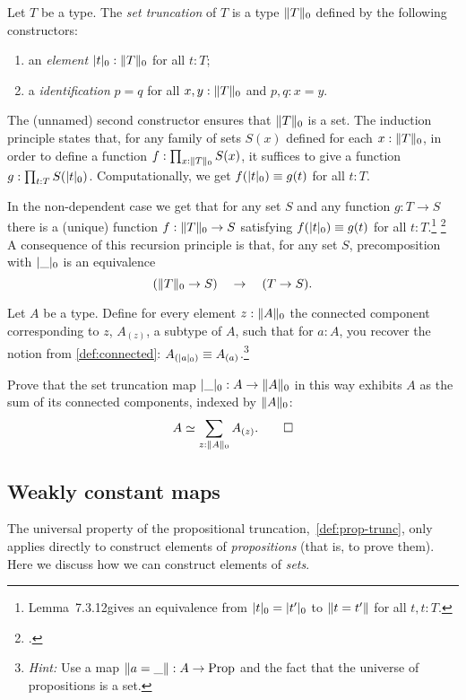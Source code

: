 \begin{definition}\label{def:set-truncation}
Let $T$ be a type. The \emph{set truncation} of $T$
is a type  $\lVert T\rVert_0$ defined by the following constructors:
\begin{enumerate}
\item an \emph{element} $\lvert t\rvert_0 : \lVert T\rVert_0$ for all $t:T$;
\item a \emph{identification} $p=q$ for all $x,y:\lVert T\rVert_0$ and $p,q: x=y$.
\end{enumerate}
The (unnamed) second constructor ensures that $\lVert T\rVert_0$ is a
set. The induction principle states that,
for any family of sets $S(x)$ defined for each $x:\lVert T\rVert_0$, 
in order to define a function $f:\prod_{x:\lVert T\rVert_0} S(x)$,
it suffices to give a function $g: \prod_{t:T} S(\lvert t\rvert_0)$.
Computationally, we get $f(\trunc{t}_0)\jdeq g(t)$ for all $t:T$. 
\end{definition}

In the non-dependent case we get that for any set $S$ and
any function $g: T\to S$ there is a (unique) function $f:\lVert T\rVert_0\to S$ 
satisfying $f(\trunc{t}_0)\jdeq g(t)$ for all $t:T$.\footnote{%
Lemma~7.3.12\footnotemark gives an equivalence from 
$\lvert t\rvert_0 = \lvert t'\rvert_0$ to $\lVert t=t'\rVert$ for all $t,t:T$.}%
\footcitetext{hottbook}
A consequence of this recursion principle is that, 
for any set $S$, precomposition with $\lvert\_\rvert_0$ is an equivalence
\[
(\lVert T\rVert_0 \to S) \quad \to \quad (T \to S).
\]
\begin{xca}\label{xca:sum-of-conn-compoenents}
  Let $A$ be a type. Define for every element $z : \lVert A\rVert_0$
  the connected component corresponding to $z$, $A_{(z)}$,
  a subtype of $A$, such that for $a:A$, you recover the notion from
  \cref{def:connected}: $A_{(\trunc{a}_0)} \jdeq A_{(a)}$.\footnote{%
    \emph{Hint:} Use a map $\lVert a={\_}\rVert : A \to \mathrm{Prop}$
    and the fact that the universe of propositions
    is a set.}
  
  Prove that the set truncation map $\lvert\_\rvert_0 : A \to \lVert A\rVert_0$
  in this way exhibits $A$ as the sum of its connected components,
  indexed by $\lVert A\rVert_0$:
  \[
    A \simeq \sum_{z : \lVert A\rVert_0} A_{(z)}. \qedhere
  \]
\end{xca}

\subsection{Weakly constant maps}

The universal property of the propositional truncation,~\cref{def:prop-trunc},
only applies directly to construct elements of \emph{propositions} (that is, to prove them).
Here we discuss how we can construct elements of \emph{sets}.

